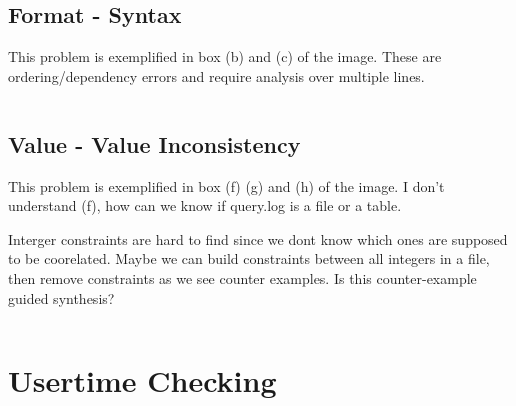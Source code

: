 \documentclass{article}
\begin{document}
\begin{lstlisting}
\end{lstlisting}

\subsection{Format - Syntax}
This problem is exemplified in box (b) and (c) of the image.
These are ordering/dependency errors and require analysis over multiple lines.

\begin{lstlisting}
\end{lstlisting}

\subsection{Value - Value Inconsistency}
This problem is exemplified in box (f) (g) and (h) of the image.
I don't understand (f), how can we know if query.log is a file or a table.

Interger constraints are hard to find since we dont know which ones are supposed to be coorelated.
Maybe we can build constraints between all integers in a file, then remove constraints as we see counter examples.
Is this counter-example guided synthesis?

\begin{lstlisting}
\end{lstlisting}




\section{Usertime Checking}




\end{document}
